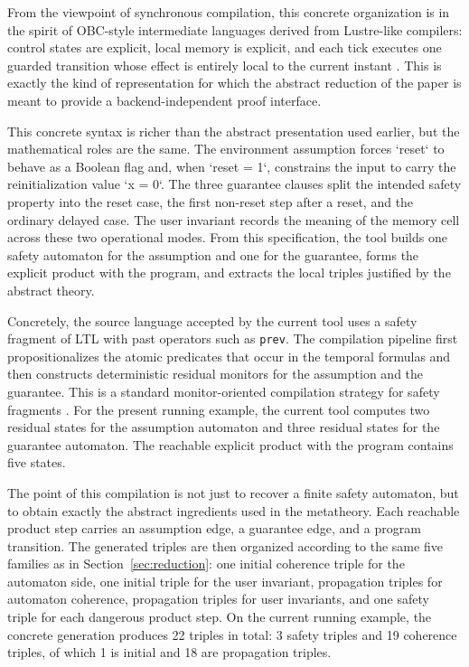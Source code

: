 \documentclass[acmsmall,screen]{acmart}
\theoremstyle{leftplain}
\theoremstyle{leftdefinition}
\theoremstyle{leftremark}
\begin{document}
From the viewpoint of synchronous compilation, this concrete organization is in
the spirit of OBC-style intermediate languages derived from Lustre-like
compilers: control states are explicit, local memory is explicit, and each tick
executes one guarded transition whose effect is entirely local to the current
instant \cite{halbwachs-1991,lustre-v6-manual,safecomp-observers}. This is exactly the kind of
representation for which the abstract reduction of the paper is meant to
provide a backend-independent proof interface.

This concrete syntax is richer than the abstract presentation used earlier, but
the mathematical roles are the same. The environment assumption forces
`reset` to behave as a Boolean flag and, when `reset = 1`, constrains the input
to carry the reinitialization value `x = 0`. The three guarantee clauses split
the intended safety property into the reset case, the first non-reset step
after a reset, and the ordinary delayed case. The user invariant records the
meaning of the memory cell across these two operational modes. From this
specification, the tool builds one safety automaton for the assumption and one
for the guarantee, forms the explicit product with the program, and extracts
the local triples justified by the abstract theory.

Concretely, the source language accepted by the current tool uses a safety
fragment of LTL with past operators such as \lstinline|prev|. The compilation
pipeline first propositionalizes the atomic predicates that occur in the
temporal formulas and then constructs deterministic residual monitors for the
assumption and the guarantee. This is a standard monitor-oriented compilation
strategy for safety fragments \cite{kupferman-vardi-safety,gastin-oddoux}. For
the present running example, the current tool computes two residual states for
the assumption automaton and three residual states for the guarantee automaton. The
reachable explicit product with the program contains five states.

The point of this compilation is not just to recover a finite safety automaton, but to
obtain exactly the abstract ingredients used in the metatheory. Each reachable
product step carries an assumption edge, a guarantee edge, and a program
transition. The generated triples are then organized according to the same five
families as in Section~\ref{sec:reduction}: one initial coherence triple for
the automaton side, one initial triple for the user invariant, propagation
triples for automaton coherence, propagation triples for user invariants, and
one safety triple for each dangerous product step. On the current running
example, the concrete generation produces 22 triples in total: 3 safety
triples and 19 coherence triples, of which 1 is initial and 18 are
propagation triples.
\end{document}
